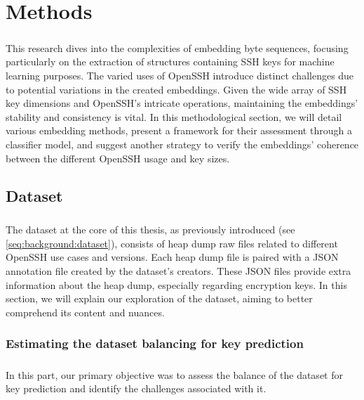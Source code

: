 \chapter{Methods}\label{chap:methods}
    \paragraph{}This research dives into the complexities of embedding byte sequences, focusing particularly on the extraction of structures containing SSH keys for machine learning purposes. The varied uses of OpenSSH introduce distinct challenges due to potential variations in the created embeddings. Given the wide array of SSH key dimensions and OpenSSH's intricate operations, maintaining the embeddings' stability and consistency is vital. In this methodological section, we will detail various embedding methods, present a framework for their assessment through a classifier model, and suggest another strategy to verify the embeddings' coherence between the different OpenSSH usage and key sizes.

    \section{Dataset}
        \paragraph{}The dataset at the core of this thesis, as previously introduced (see \ref{seq:background:dataset}), consists of heap dump raw files related to different OpenSSH use cases and versions. Each heap dump file is paired with a JSON annotation file created by the dataset's creators. These JSON files provide extra information about the heap dump, especially regarding encryption keys. In this section, we will explain our exploration of the dataset, aiming to better comprehend its content and nuances.

        \subsection{Estimating the dataset balancing for key prediction}
            \paragraph{}In this part, our primary objective was to assess the balance of the dataset for key prediction and identify the challenges associated with it.

